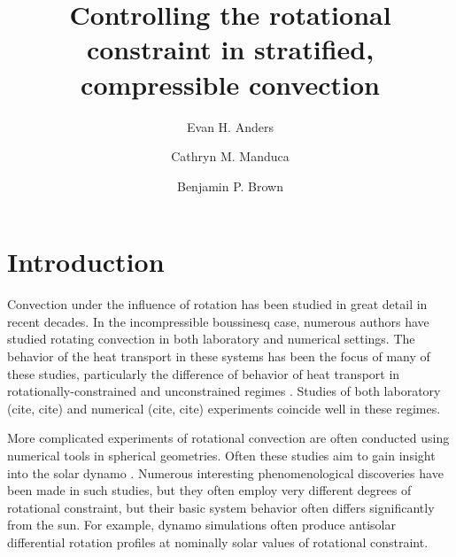 \documentclass[twocolumn, amsmath, amsfonts, amssymb]{aastex62}
\begin{document}
\title{Controlling the rotational constraint in stratified, compressible convection}


\author{Evan H. Anders}
\author{Cathryn M. Manduca}
\author{Benjamin P. Brown}


\begin{abstract}
\end{abstract}


\section{Introduction}
\label{sec:intro}
Convection under the influence of rotation has been studied in great detail in
recent decades. In the incompressible boussinesq case, numerous authors have
studied rotating convection in both laboratory and numerical settings. The
behavior of the heat transport in these systems has been the focus of many
of these studies, particularly the difference of behavior of heat transport
in rotationally-constrained and unconstrained regimes 
\citep{king&all2009, zhong&all2009, stevens&all2009, julien&all2012}. 
Studies of both laboratory (cite, cite) and numerical (cite, cite) experiments
coincide well in these regimes.

More complicated experiments of rotational convection are often conducted
using numerical tools in spherical geometries. Often these studies aim to
gain insight into the solar dynamo \citep{glatzmaier&gilman1982, busse2002, brown&all2008,
brown&all2010, brown&all2011, augustson&all2012, guerrero&all2013, kapyla&all2014}.
Numerous interesting phenomenological discoveries have been made in such studies,
but they often employ very different degrees of rotational constraint, but their
basic system behavior often differs significantly from the sun. For example, 
dynamo simulations often produce antisolar differential rotation profiles at
nominally solar values of rotational constraint.
\end{document}
